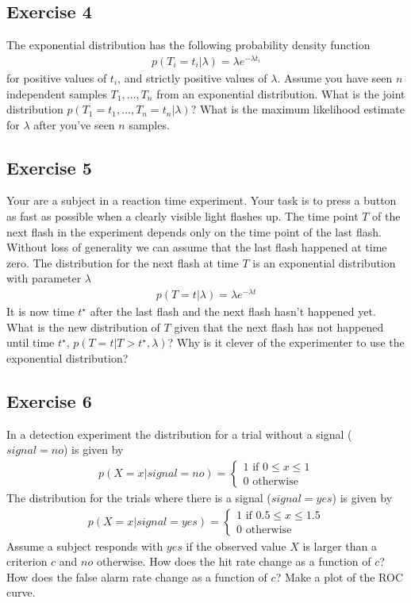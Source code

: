\documentclass[../main/Notes.tex]{subfiles}
\begin{document}
\subsection*{Exercise 4}
The exponential distribution has the following probability density function
\begin{align*}
p(T_i=t_i|\lambda)=\lambda e^{-\lambda t_i}
\end{align*}
for positive values of $t_i$, and strictly positive values of $\lambda$. Assume you have seen $n$ independent samples $T_1,\dots,T_n$ from an exponential distribution. What is the joint distribution $p(T_1=t_1,\dots,T_n=t_n|\lambda)$? What is the maximum likelihood estimate for $\lambda$ after you've seen $n$ samples.


\subsection*{Exercise 5}
Your are a subject in a reaction time experiment. Your task is to press a button as fast as possible when a clearly visible light flashes up. The time point $T$ of the next flash in the experiment depends only on the time point of the last flash. Without loss of generality we can assume that the last flash happened at time zero. The distribution for the next flash at time $T$ is an exponential distribution with parameter $\lambda$
\begin{align*}
p(T=t|\lambda)=\lambda e^{-\lambda t}
\end{align*}
It is now time $t^\star$ after the last flash and the next flash hasn't happened yet. What is the new distribution of $T$ given that the next flash has not happened until time $t^\star$, $p(T=t|T>t^\star,\lambda)$? Why is it clever of the experimenter to use the exponential distribution?


\subsection*{Exercise 6}
In a detection experiment the distribution for a trial without a signal ($signal = no$) is given by
\begin{align*}
p(X=x|signal = no) = \begin{cases}
  1 \text{ if }0\leq x \leq 1\\ 
  0 \text{ otherwise}
\end{cases}
\end{align*}
The distribution for the trials where there is a signal ($signal = yes$) is given by
\begin{align*}
p(X=x|signal = yes) = \begin{cases}
  1 \text{ if }0.5\leq x \leq 1.5\\ 
  0 \text{ otherwise}
\end{cases}
\end{align*}
Assume a subject responds with $yes$ if the observed value $X$ is larger than a criterion $c$ and $no$ otherwise. How does the hit rate change as a function of $c$? How does the false alarm rate change as a function of $c$? Make a plot of the ROC curve.
\end{document}
